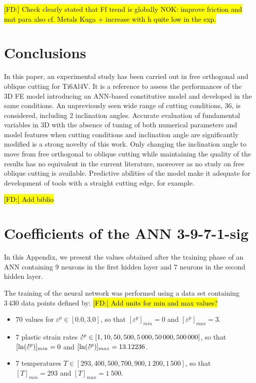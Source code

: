 \documentclass[final,5p,times,twocolumn]{elsarticle}
\newcommand{\mdot}[1]{\accentset{\mbox{\bfseries .}}{#1}}
\DeclareRobustCommand{\FD}[1]{ {\begingroup\sethlcolor{VWgreen}\textcolor{black}{\hl{[FD:] #1}}\endgroup} }
\begin{document}
\FD{Check clearly stated that Ff trend is globally NOK: improve friction and mat para also cf. Metals Kuga + increase with h quite low in the exp.}
\section{Conclusions}

In this paper, an experimental study has been carried out in free orthogonal and oblique cutting for Ti6Al4V. It is a reference to assess the performances of the 3D FE model introducing an ANN-based constitutive model and developed in the same conditions. An unpreviously seen wide range of cutting conditions, 36, is considered, including 2 inclination angles.
Accurate evaluation of fundamental variables in 3D with the absence of tuning of both numerical parameters and model features when cutting conditions and inclination angle are significantly modified is a strong novelty of this work. Only changing the inclination angle to move from free orthogonal to oblique cutting while maintaining the quality of the results has no equivalent in the current literature, moreover as no study on free oblique cutting is available. Predictive abilities of the model make it adequate for development of tools with a straight cutting edge, for example.

\FD{Add biblio}

\appendix
%
\section{Coefficients of the ANN 3-9-7-1-sig\label{sec:appendix-1}}

In this Appendix, we present the values obtained after the training phase of an ANN containing 9 neurons in the first hidden layer and 7 neurons in the second hidden layer.

The training of the neural network was performed using a data set containing $3\,430$ data points defined by: \FD{Add units for min and max values?}
\begin{itemize}
\item $70$ values for $\varepsilon^p\in[0.0,3.0]$, so that $[\varepsilon^p]_{min}=0$ and $[\varepsilon^p]_{max}=3$.
\item $7$ plastic strain rates $\mdot{\varepsilon}^p\in[1, 10, 50, 500, 5\,000, 50\,000, 500\,000]$, so that $[\ln(\mdot{\varepsilon}^p)]_{min}=0$ and $[\ln(\mdot{\varepsilon}^p)]_{max}=13.12236$.
\item  $7$ temperatures $T\in[293, 400, 500, 700, 900, 1\,200, 1\,500]$, so that $[T]_{min}=293$ and $[T]_{max}=1\ 500$.
\end{itemize}
\end{document}
